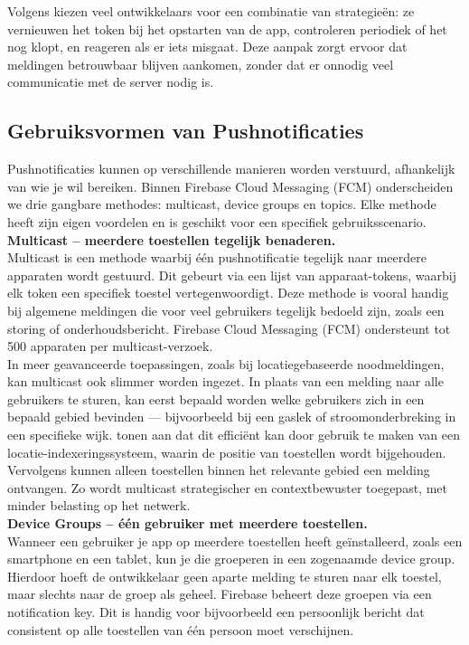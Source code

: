 Volgens \textcite{pushwoosh2025} kiezen veel ontwikkelaars voor een combinatie van strategieën: ze vernieuwen het token bij het opstarten van de app, controleren periodiek of het nog klopt, en reageren als er iets misgaat. Deze aanpak zorgt ervoor dat meldingen betrouwbaar blijven aankomen, zonder dat er onnodig veel communicatie met de server nodig is.\\

\subsection{Gebruiksvormen van Pushnotificaties}

Pushnotificaties kunnen op verschillende manieren worden verstuurd, afhankelijk van wie je wil bereiken. Binnen Firebase Cloud Messaging (FCM) onderscheiden we drie gangbare methodes: multicast, device groups en topics. Elke methode heeft zijn eigen voordelen en is geschikt voor een specifiek gebruiksscenario.\\

\textbf{Multicast – meerdere toestellen tegelijk benaderen.}\\
Multicast is een methode waarbij één pushnotificatie tegelijk naar meerdere apparaten wordt gestuurd. Dit gebeurt via een lijst van apparaat-tokens, waarbij elk token een specifiek toestel vertegenwoordigt. Deze methode is vooral handig bij algemene meldingen die voor veel gebruikers tegelijk bedoeld zijn, zoals een storing of onderhoudsbericht. Firebase Cloud Messaging (FCM) ondersteunt tot 500 apparaten per multicast-verzoek.\\

In meer geavanceerde toepassingen, zoals bij locatiegebaseerde noodmeldingen, kan multicast ook slimmer worden ingezet. In plaats van een melding naar alle gebruikers te sturen, kan eerst bepaald worden welke gebruikers zich in een bepaald gebied bevinden — bijvoorbeeld bij een gaslek of stroomonderbreking in een specifieke wijk. \textcite{ThuThuZan2018} tonen aan dat dit efficiënt kan door gebruik te maken van een locatie-indexeringssysteem, waarin de positie van toestellen wordt bijgehouden. Vervolgens kunnen alleen toestellen binnen het relevante gebied een melding ontvangen. Zo wordt multicast strategischer en contextbewuster toegepast, met minder belasting op het netwerk.\\

\textbf{Device Groups – één gebruiker met meerdere toestellen.}\\
Wanneer een gebruiker je app op meerdere toestellen heeft geïnstalleerd, zoals een smartphone en een tablet, kun je die groeperen in een zogenaamde device group. Hierdoor hoeft de ontwikkelaar geen aparte melding te sturen naar elk toestel, maar slechts naar de groep als geheel. Firebase beheert deze groepen via een notification key. Dit is handig voor bijvoorbeeld een persoonlijk bericht dat consistent op alle toestellen van één persoon moet verschijnen.\\


